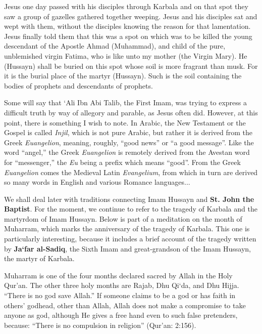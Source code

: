 \begin{quotex}
Jesus one day passed with his disciples through Karbala and on that spot they saw a group of gazelles gathered together weeping. Jesus and his disciples sat and wept with them, without the disciples knowing the reason for that lamentation. Jesus finally told them that this was a spot on which was to be killed the young descendant of the Apostle Ahmad (Muhammad), and child of the pure, unblemished virgin Fatima, who is like unto my mother (the Virgin Mary). He (Hussayn) shall be buried on this spot whose soil is more fragrant than musk. For it is the burial place of the martyr (Hussayn). Such is the soil containing the bodies of prophets and descendants of prophets.
\end{quotex}


Some will say that `Ali Ibn Abi Talib, the First Imam, was trying to express a difficult truth by way of allegory and parable, as Jesus often did. However, at this point, there is something I wish to note. In Arabic, the New Testament or the Gospel is called \emph{Injil}, which is not pure Arabic, but rather it is derived from the Greek \emph{Euangelion}, meaning, roughly, ``good news'' or ``a good message''. Like the word ``angel,'' the Greek \emph{Euangelion} is remotely derived from the Avestan word for ``messenger,'' the \emph{Eu} being a prefix which means ``good''. From the Greek \emph{Euangelion} comes the Medieval Latin \emph{Evangelium}, from which in turn are derived so many words in English and various Romance languages...

We shall deal later with traditions connecting Imam Hussayn and \textbf{St. John the Baptist}. For the moment, we continue to refer to the tragedy of Karbala and the martyrdom of Imam Hussayn. Below is part of a meditation on the month of Muharram, which marks the anniversary of the tragedy of Karbala. This one is particularly interesting, because it includes a brief account of the tragedy written by \textbf{Ja`far al-Sadiq}, the Sixth Imam and great-grandson of the Imam Hussayn, the martyr of Karbala.

\begin{quotex}
Muharram is one of the four months declared sacred by Allah in the Holy Qur'an. The other three holy months are Rajab, Dhu Qi`da, and Dhu Hijja. ``There is no god save Allah.'' If someone claims to be a god or has faith in others' godhead, other than Allah, Allah does not make a compromise to take anyone as god, although He gives a free hand even to such false pretenders, because: ``There is no compulsion in religion'' (Qur'an: 2:156).
\end{quotex}


